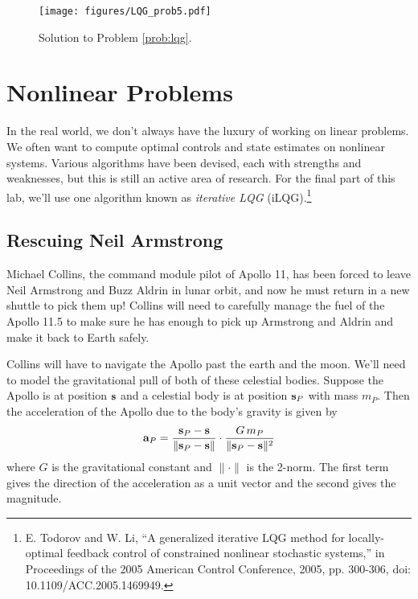\begin{figure}
    \centering
    \texttt{[image: figures/LQG\_prob5.pdf]}
    \caption{Solution to Problem \ref{prob:lqg}.}
    \label{fig:prob-lqg}
\end{figure}

\section*{Nonlinear Problems}

In the real world, we don't always have the luxury of working on linear problems.
We often want to compute optimal controls and state estimates on nonlinear systems.
Various algorithms have been devised, each with strengths and weaknesses, but this is still an active area of research.
For the final part of this lab, we'll use one algorithm known as \textit{iterative LQG} (iLQG).\footnote{E. Todorov and W. Li, ``A generalized iterative LQG method for locally-optimal feedback control of constrained nonlinear stochastic systems,'' in Proceedings of the 2005 American Control Conference, 2005, pp. 300-306, doi: 10.1109/ACC.2005.1469949.}


\subsection*{Rescuing Neil Armstrong}

Michael Collins, the command module pilot of Apollo 11, has been forced to leave Neil Armstrong and Buzz Aldrin in lunar orbit, and now he must return in a new shuttle to pick them up!
Collins will need to carefully manage the fuel of the Apollo 11.5 to make sure he has enough to pick up Armstrong and Aldrin and make it back to Earth safely.

Collins will have to navigate the Apollo past the earth and the moon.
We'll need to model the gravitational pull of both of these celestial bodies.
Suppose the Apollo is at position $\mathbf s$ and a celestial body is at position $\mathbf s_P$ with mass $m_P$.
Then the acceleration of the Apollo due to the body's gravity is given by
\begin{equation*}
\mathbf{a}_P = \frac {\mathbf s_P - \mathbf s} {\lVert \mathbf s_P - \mathbf s \rVert} \cdot
\frac {G \, m_P} {\lVert \mathbf s_P - \mathbf s \rVert^2}
\end{equation*}
where $G$ is the gravitational constant and $\lVert \cdot \rVert$ is the 2-norm.
The first term gives the direction of the acceleration as a unit vector and the second gives the magnitude.

